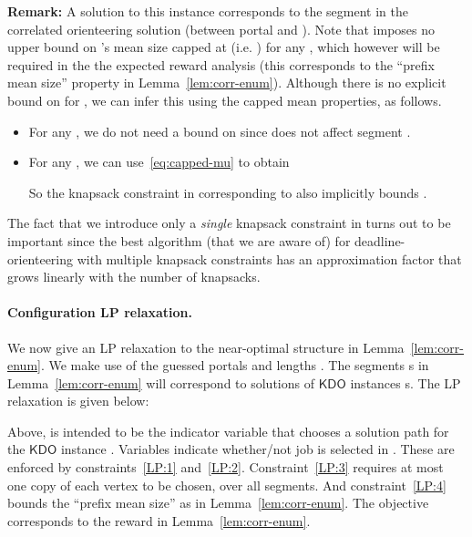\documentclass[11pt,letterpaper]{article}
\numberwithin{algorithm}{section}
\newcommand{\kdo}{\ensuremath{\mathsf{KDO}}\xspace}
\begin{document}
{\bf Remark:} A solution  to this instance  corresponds to the  segment in the correlated orienteering solution (between portal  and ). Note that  imposes no upper bound on
's mean size capped at  (i.e. ) for any , which however will be required in the the expected reward analysis (this corresponds to the ``prefix mean size'' property
in Lemma~\ref{lem:corr-enum}). Although there is no explicit bound on  for , we can infer this using the capped mean properties, as follows.
\begin{itemize}
\item For any , we do not need a bound on  since  does not affect segment .
\item For any  , we can use~\eqref{eq:capped-mu} to obtain

So the knapsack constraint in  corresponding to  also implicitly bounds .
\end{itemize}
The fact that we introduce only a {\em single} knapsack constraint in  turns out to be important since the best algorithm (that we are aware of) for deadline-orienteering with multiple knapsack constraints has an approximation factor that grows linearly with the number of knapsacks.

\paragraph{Configuration LP relaxation.} We now give an LP
relaxation to the near-optimal structure in Lemma~\ref{lem:corr-enum}. We make use of the guessed portals  and lengths . The segments s in Lemma~\ref{lem:corr-enum} will correspond to solutions of \kdo instances s. The LP relaxation is given below:


Above,  is intended to be the indicator variable that chooses a solution path for the \kdo instance . Variables  indicate whether/not job  is selected in . These are enforced by constraints~\eqref{LP:1} and~\eqref{LP:2}. Constraint~\eqref{LP:3} requires at most one copy of each vertex to be chosen, over all segments. And constraint~\eqref{LP:4} bounds the ``prefix mean size'' as in Lemma~\ref{lem:corr-enum}. The objective corresponds to the reward in  Lemma~\ref{lem:corr-enum}.
\end{document}

